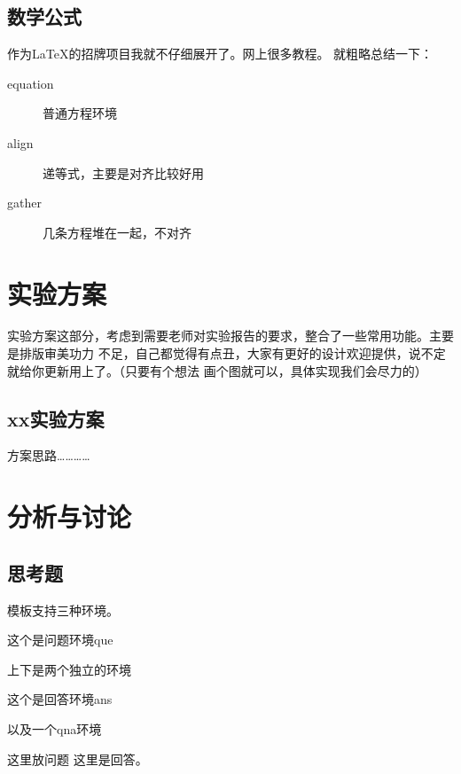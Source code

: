 \documentclass{spaexp}
\begin{document}
    \subsection{数学公式}
        作为\LaTeX 的招牌项目我就不仔细展开了。网上很多教程。
        就粗略总结一下：
        \begin{description}
            \item[equation] 普通方程环境
            \item[align] 递等式，主要是对齐比较好用
            \item[gather] 几条方程堆在一起，不对齐
        \end{description}
    
\section{实验方案}
    实验方案这部分，考虑到需要老师对实验报告的要求，整合了一些常用功能。主要是排版审美功力
    不足，自己都觉得有点丑，大家有更好的设计欢迎提供，说不定就给你更新用上了。（只要有个想法
    画个图就可以，具体实现我们会尽力的）

    \subsection{xx实验方案}
        方案思路…………

        \recordhead
        \begin{step}
            \movehead
        \end{step}

\section{分析与讨论}
    \subsection{思考题}
        模板支持三种环境。
        \begin{que}
            这个是问题环境que
        \end{que}
        \vspace{2cm}
        上下是两个独立的环境
        \vspace{2cm}
        \begin{ans}
            这个是回答环境ans
        \end{ans}

        以及一个qna环境
        \begin{qna}{这里放问题}
            这里是回答。
        \end{qna}
\end{document}
